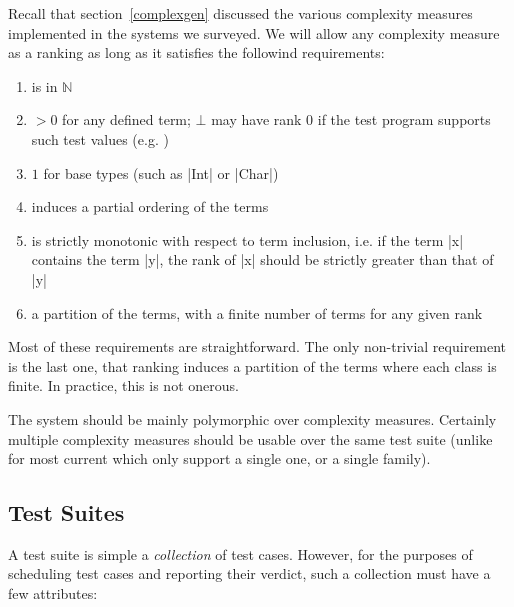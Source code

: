 Recall that section~\ref{complexgen} discussed the various complexity measures
implemented in the systems we surveyed. We will allow any complexity
measure as a ranking as long as it satisfies the followind requirements:
\begin{enumerate}
    \item is in $\mathbb{N}$
    \item $>0$ for any defined term; $\bot$ may have rank 0 if the test program supports such test values (e.g. \LSC)    
    \item $1$ for base types (such as |Int| or |Char|)
    \item induces a partial ordering of the terms
    \item is strictly monotonic with respect to term inclusion,
    i.e. if the term |x| contains the term |y|, the rank of |x| should be strictly greater than that of |y|
    \item a partition of the terms, with a finite number of terms for any given rank
\end{enumerate}
\noindent Most of these requirements are straightforward. The only non-trivial
requirement is the last one, that ranking induces a partition of the terms where
each class is finite.  In practice, this is not onerous.

The system should be mainly polymorphic over complexity measures. Certainly
multiple complexity measures should be usable over the same test suite (unlike
for most current \pbt which only support a single one, or a single family).

\subsection{Test Suites}

A test suite is simple a \emph{collection} of test cases. However,
for the purposes of scheduling test cases and reporting their verdict,
such a collection must have a few attributes:

